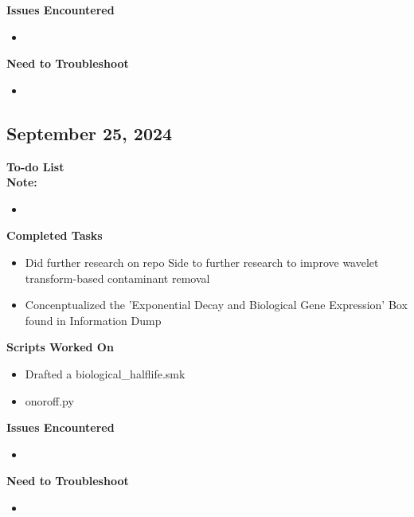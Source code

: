 \documentclass[11pt]{report}
\newcommand{\done}{\checkmark}
\begin{document}
{\begin{multicols}{2}
\begin{itemize}
\end{itemize}


\textbf{Issues Encountered}
\begin{itemize}
	\item 
\end{itemize}

\textbf{Need to Troubleshoot}
\begin{itemize}
	\item 
\end{itemize}
\end{multicols}

\newpage

\begin{multicols}{2}
\section{September 25, 2024}


\textbf{To-do List} \\
\textbf{Note:} 

\begin{itemize}
	\item [\done] 
	
	
\end{itemize}

\textbf{Completed Tasks}
\begin{itemize}
	\item Did further research on repo Side to further research to improve wavelet transform-based contaminant removal 
	\item Concenptualized the 'Exponential Decay and Biological Gene Expression' Box found in Information Dump
\end{itemize}

\textbf{Scripts Worked On}
\begin{itemize}
	\item Drafted a biological\_halflife.smk
	\item onoroff.py
\end{itemize}


\textbf{Issues Encountered}
\begin{itemize}
	\item 
\end{itemize}

\textbf{Need to Troubleshoot}
\begin{itemize}
	\item 
\end{itemize}
\end{multicols}


}
\end{document}

